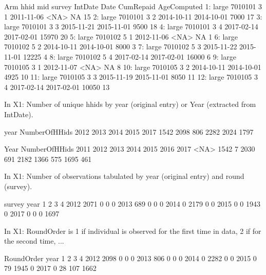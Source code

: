 \begin{Schunk}
\begin{Soutput}
      Arm    hhid mid survey    IntDate       Date CumRepaid AgeComputed
 1: large 7010101   3      1 2011-11-06       <NA>        NA          15
 2: large 7010101   3      2 2014-10-11 2014-10-01      7000          17
 3: large 7010101   3      3 2015-11-21 2015-11-01      9500          18
 4: large 7010101   3      4 2017-02-14 2017-02-01     15970          20
 5: large 7010102   5      1 2012-11-06       <NA>        NA           1
 6: large 7010102   5      2 2014-10-11 2014-10-01      8000           3
 7: large 7010102   5      3 2015-11-22 2015-11-01     12225           4
 8: large 7010102   5      4 2017-02-14 2017-02-01     16000           6
 9: large 7010105   3      1 2012-11-07       <NA>        NA           8
10: large 7010105   3      2 2014-10-11 2014-10-01      4925          10
11: large 7010105   3      3 2015-11-19 2015-11-01      8050          11
12: large 7010105   3      4 2017-02-14 2017-02-01     10050          13
\end{Soutput}
\end{Schunk}
In \textsf{X1}: Number of unique \textsf{hhid}s by \textsf{year} (original entry) or \textsf{Year} (extracted from \textsf{IntDate}).
\begin{Schunk}
\begin{Soutput}
             year
NumberOfHHids 2012 2013 2014 2015 2017
         1542 2098  806 2282 2024 1797
\end{Soutput}
\begin{Soutput}
             Year
NumberOfHHids 2011 2012 2013 2014 2015 2016 2017 <NA>
         1542    7 2030  691 2182 1366  575 1695  461
\end{Soutput}
\end{Schunk}
In \textsf{X1}: Number of observations tabulated by \textsf{year} (original entry) and round (\textsf{survey}).
\begin{Schunk}
\begin{Soutput}
      survey
year      1    2    3    4
  2012 2071    0    0    0
  2013  689    0    0    0
  2014    0 2179    0    0
  2015    0    0 1943    0
  2017    0    0    0 1697
\end{Soutput}
\end{Schunk}
In \textsf{X1}: RoundOrder is 1 if individual is observed for the first time in data, 2 if for the second time, ...
\begin{Schunk}
\begin{Soutput}
      RoundOrder
year      1    2    3    4
  2012 2098    0    0    0
  2013  806    0    0    0
  2014    0 2282    0    0
  2015    0   79 1945    0
  2017    0   28  107 1662
\end{Soutput}
\end{Schunk}
